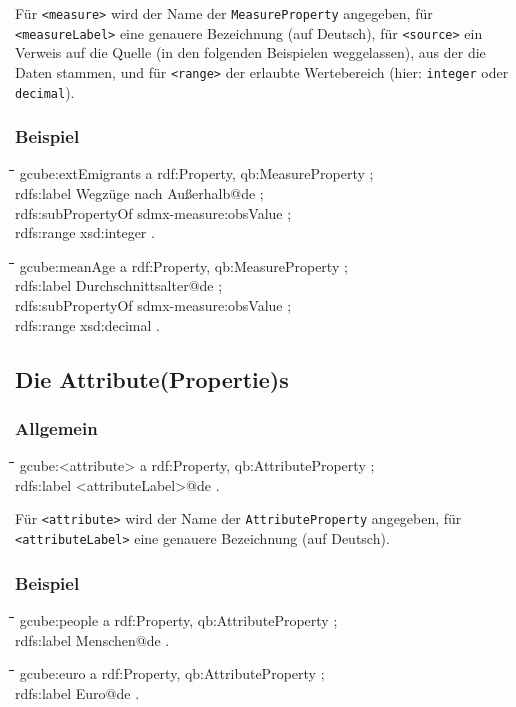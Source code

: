 \documentclass[a4paper,11pt]{article}
\newenvironment{code}{\tt \begin{tabbing}
\hskip12pt\=\hskip12pt\=\hskip12pt\=\hskip12pt\=\hskip5cm\=\hskip5cm\=\kill}
{\end{tabbing}}
\begin{document}
Für \texttt{<measure>} wird der Name der \texttt{MeasureProperty} angegeben,
für \texttt{<measureLabel>} eine genauere Bezeichnung (auf Deutsch), für
\texttt{<source>} ein Verweis auf die Quelle (in den folgenden Beispielen
weggelassen), aus der die Daten stammen, und für \texttt{<range>} der erlaubte
Wertebereich (hier: \texttt{integer} oder \texttt{decimal}).

\subsubsection{Beispiel}
\begin{code}
gcube:extEmigrants a rdf:Property, qb:MeasureProperty ;\+\\
    rdfs:label {\dq}Wegzüge nach Außerhalb{\dq}@de ;\\
    rdfs:subPropertyOf sdmx-measure:obsValue ;\\
    rdfs:range xsd:integer .
\end{code}
\begin{code}
gcube:meanAge a rdf:Property, qb:MeasureProperty ;\+\\
    rdfs:label {\dq}Durchschnittsalter{\dq}@de ;\\
    rdfs:subPropertyOf sdmx-measure:obsValue ;\\
    rdfs:range xsd:decimal .
\end{code}

\subsection{Die Attribute(Propertie)s} 
\label{Attributes}

\subsubsection{Allgemein}
\begin{code}
gcube:<attribute> a rdf:Property, qb:AttributeProperty ;\+\\
    rdfs:label {\dq}<attributeLabel>{\dq}@de .
\end{code}

Für \texttt{<attribute>} wird der Name der \texttt{AttributeProperty}
angegeben, für \texttt{<attributeLabel>} eine genauere Bezeichnung (auf
Deutsch).

\subsubsection{Beispiel}
\begin{code}
gcube:people a rdf:Property, qb:AttributeProperty ;\+\\
    rdfs:label {\dq}Menschen{\dq}@de .
\end{code}
\begin{code}
gcube:euro a rdf:Property, qb:AttributeProperty ;\+\\
    rdfs:label {\dq}Euro{\dq}@de .
\end{code}
\end{document}
